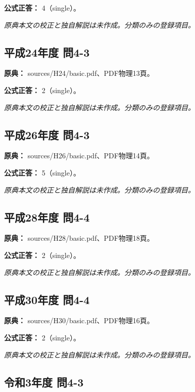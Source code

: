 \textbf{公式正答：} 4（single）。

\par\textit{原典本文の校正と独自解説は未作成。分類のみの登録項目。}

\subsection{平成24年度 問4-3}
\label{q:h24-reg-basic-4-3}

\noindent\textbf{原典：} sources/H24/basic.pdf、PDF物理13頁。

\textbf{公式正答：} 2（single）。

\par\textit{原典本文の校正と独自解説は未作成。分類のみの登録項目。}

\subsection{平成26年度 問4-3}
\label{q:h26-reg-basic-4-3}

\noindent\textbf{原典：} sources/H26/basic.pdf、PDF物理14頁。

\textbf{公式正答：} 5（single）。

\par\textit{原典本文の校正と独自解説は未作成。分類のみの登録項目。}

\subsection{平成28年度 問4-4}
\label{q:h28-reg-basic-4-4}

\noindent\textbf{原典：} sources/H28/basic.pdf、PDF物理18頁。

\textbf{公式正答：} 2（single）。

\par\textit{原典本文の校正と独自解説は未作成。分類のみの登録項目。}

\subsection{平成30年度 問4-4}
\label{q:h30-reg-basic-4-4}

\noindent\textbf{原典：} sources/H30/basic.pdf、PDF物理16頁。

\textbf{公式正答：} 2（single）。

\par\textit{原典本文の校正と独自解説は未作成。分類のみの登録項目。}

\subsection{令和3年度 問4-3}
\label{q:r03-reg-basic-4-3}

